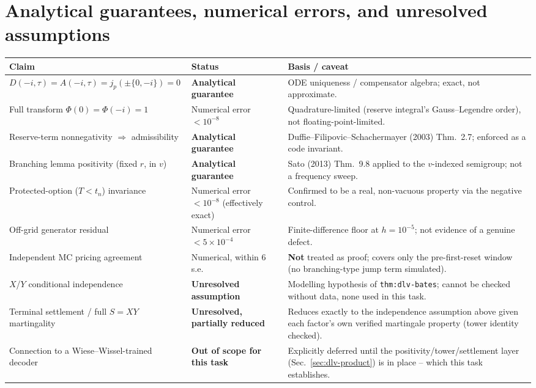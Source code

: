 \section{Analytical guarantees, numerical errors, and unresolved assumptions}
\label{sec:deferred}

\begin{table}[H]
\centering
\small
\begin{tabular}{p{5.6cm}p{3.3cm}p{5.6cm}}
\toprule
Claim & Status & Basis / caveat \\
\midrule
$D(-i,\tau)=A(-i,\tau)=j_p(\pm\{0,-i\})=0$ &
  \textbf{Analytical guarantee} & ODE uniqueness / compensator algebra; exact, not approximate. \\
Full transform $\Phi(0)=\Phi(-i)=1$ &
  Numerical error $<10^{-8}$ & Quadrature-limited (reserve integral's Gauss--Legendre order), not floating-point-limited. \\
Reserve-term nonnegativity $\Rightarrow$ admissibility &
  \textbf{Analytical guarantee} & Duffie--Filipovic--Schachermayer (2003) Thm.~2.7; enforced as a code invariant. \\
Branching lemma positivity (fixed $r$, in $v$) &
  \textbf{Analytical guarantee} & Sato (2013) Thm.~9.8 applied to the $v$-indexed semigroup; not a frequency sweep. \\
Protected-option ($T<t_n$) invariance &
  Numerical error $<10^{-8}$ (effectively exact) & Confirmed to be a real, non-vacuous property via the negative control. \\
Off-grid generator residual &
  Numerical error $<5\times10^{-4}$ & Finite-difference floor at $h=10^{-5}$; not evidence of a genuine defect. \\
Independent MC pricing agreement &
  Numerical, within $6$ s.e. & \textbf{Not} treated as proof; covers only the pre-first-reset window (no branching-type jump term simulated). \\
$X$/$Y$ conditional independence &
  \textbf{Unresolved assumption} & Modelling hypothesis of \texttt{thm:dlv-bates}; cannot be checked without data, none used in this task. \\
Terminal settlement / full $S=XY$ martingality &
  \textbf{Unresolved, partially reduced} & Reduces exactly to the independence assumption above given each factor's own verified martingale property (tower identity checked). \\
Connection to a Wiese--Wissel-trained decoder &
  \textbf{Out of scope for this task} & Explicitly deferred until the positivity/tower/settlement layer (Sec.~\ref{sec:dlv-product}) is in place -- which this task establishes. \\

\end{tabular}
\end{table}
